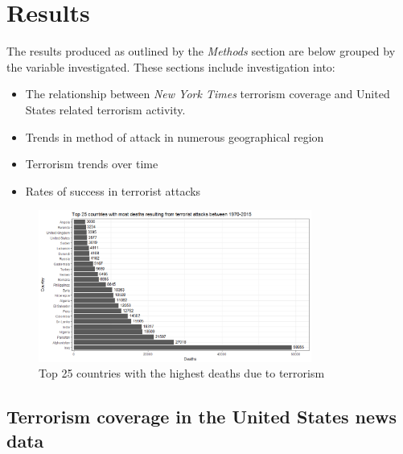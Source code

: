 \documentclass[10pt,a4paper]{article}
\begin{document}
\section{Results}
The results produced as outlined by the \textit{Methods} section are below grouped by the variable investigated. These sections include investigation into:\\
\begin{itemize}
\item The relationship between \textit{New York Times} terrorism coverage and United States related terrorism activity.
\item Trends in method of attack in numerous geographical region
\item Terrorism trends over time
\item Rates of success in terrorist attacks 

\end{itemize}

\begin{center}
\begin{figure}[H]
		
	\includegraphics[width=0.8\textwidth]{Plots/Top25countriesbydeaths.png}
	\caption{Top 25 countries with the highest deaths due to terrorism}

\end{figure}

\end{center}

\subsection{Terrorism coverage in the United States news data}
\end{document}
